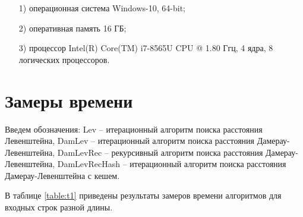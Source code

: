 \documentclass[12pt]{report}
\begin{document}
	\begin{enumerate}
		\item[1)] операционная система Windows-10, 64-bit;
		\item[2)] оперативная память 16 ГБ;
		\item[3)] процессор Intel(R) Core(TM) i7-8565U CPU @ 1.80 Ггц, 4 ядра, 8 логических процессоров.
	\end{enumerate}
	
	\section{Замеры времени}
	
	Введем обозначения: Lev -- итерационный алгоритм поиска расстояния Левенштейна, DamLev -- итерационный алгоритм поиска расстояния Дамерау-Левенштейна, DamLevRec -- рекурсивный алгоритм поиска расстояния Дамерау-Левенштейна, DamLevRecHash -- итерационный алгоритм поиска расстояния Дамерау-Левенштейна с кешем.
	
	В таблице \ref{table:t1} приведены результаты замеров времени алгоритмов для входных строк разной длины.
	
\end{document}
